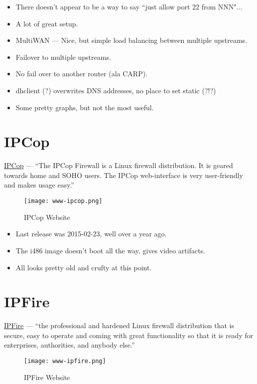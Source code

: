 \begin{itemize}
 \item There doesn't appear to be a way to say ``just allow port 22 from NNN"...
 \item A lot of great setup.
 \item MultiWAN --- Nice, but simple load balancing between multiple upstreams.
 \item Failover to multiple upstreams.
 \item No fail over to another router (ala CARP).
 \item dhclient (?) overwrites DNS addresses, no place to set static (?!?)
 \item Some pretty graphs, but not the most useful.
\end{itemize}


\section{IPCop}
\href{http://www.ipcop.org/}{IPCop} --- ``The IPCop Firewall is a Linux firewall distribution. It is geared towards home and SOHO users. The IPCop web-interface is very user-friendly and makes usage easy.''

\begin{figure}[h!]
\texttt{[image: www-ipcop.png]}
 \caption{IPCop Website}
 \label{fig:www-ipcop}
\end{figure}


\begin{itemize}
 \item Last release was 2015-02-23, well over a year ago.
 \item The i486 image doesn't boot all the way, gives video artifacts.
 \item All looks pretty old and crufty at this point.
\end{itemize}


\section{IPFire}
\href{http://www.ipfire.org/}{IPFire} --- ``the professional and hardened Linux firewall distribution that is secure, easy to operate and coming with great functionality so that it is ready for enterprises, authorities, and anybody else.''

\begin{figure}[h!]
\texttt{[image: www-ipfire.png]}
 \caption{IPFire Website}
 \label{fig:www-ipfire}
\end{figure}


